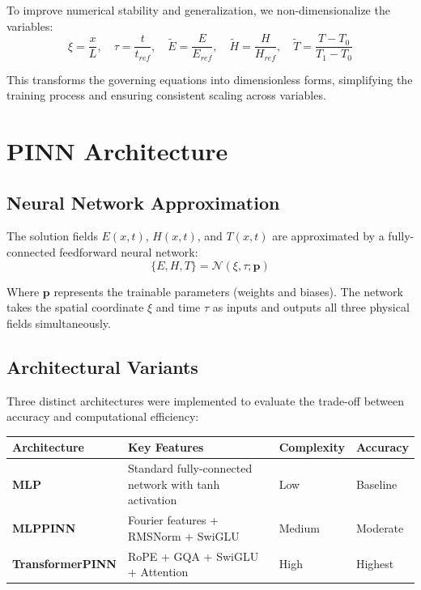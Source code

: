 \documentclass[11pt,a4paper]{article}
\begin{document}
To improve numerical stability and generalization, we non-dimensionalize the variables:
\begin{equation}
    \xi = \frac{x}{L}, \quad \tau = \frac{t}{t_{ref}}, \quad \tilde{E} = \frac{E}{E_{ref}}, \quad \tilde{H} = \frac{H}{H_{ref}}, \quad \tilde{T} = \frac{T - T_0}{T_1 - T_0}
\end{equation}

This transforms the governing equations into dimensionless forms, simplifying the training process and ensuring consistent scaling across variables.

\section{PINN Architecture}

\subsection{Neural Network Approximation}

The solution fields $E(x,t)$, $H(x,t)$, and $T(x,t)$ are approximated by a fully-connected feedforward neural network:
\begin{equation}
    \{E, H, T\} = \mathcal{N}(\xi, \tau; \mathbf{p})
\end{equation}

Where $\mathbf{p}$ represents the trainable parameters (weights and biases). The network takes the spatial coordinate $\xi$ and time $\tau$ as inputs and outputs all three physical fields simultaneously.

\subsection{Architectural Variants}

Three distinct architectures were implemented to evaluate the trade-off between accuracy and computational efficiency:

\begin{center}
\begin{tabular}{@{}llll@{}}
\toprule
\textbf{Architecture} & \textbf{Key Features} & \textbf{Complexity} & \textbf{Accuracy} \\
\midrule
\textbf{MLP} & Standard fully-connected network with tanh activation & Low & Baseline \\
\textbf{MLPPINN} & Fourier features + RMSNorm + SwiGLU & Medium & Moderate \\
\textbf{TransformerPINN} & RoPE + GQA + SwiGLU + Attention & High & Highest \\
\bottomrule
\end{tabular}
\end{center}
\end{document}
